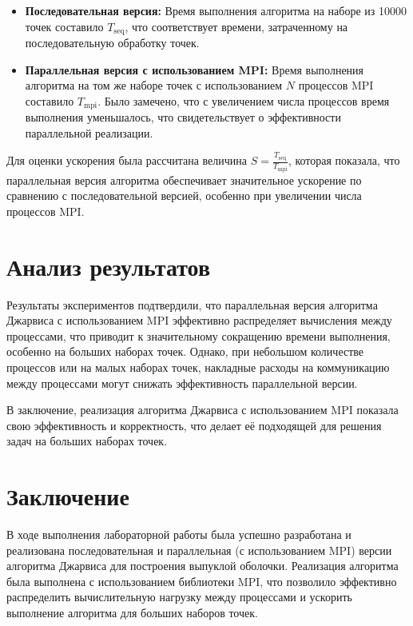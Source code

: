 \documentclass[12pt]{article}
\begin{document}
\begin{itemize}
\item \textbf{Последовательная версия:} Время выполнения алгоритма на наборе из 10000 точек составило \( T_{\text{seq}} \), что соответствует времени, затраченному на последовательную обработку точек.
\item \textbf{Параллельная версия с использованием MPI:} Время выполнения алгоритма на том же наборе точек с использованием \( N \) процессов MPI составило \( T_{\text{mpi}} \). Было замечено, что с увеличением числа процессов время выполнения уменьшалось, что свидетельствует о эффективности параллельной реализации.
\end{itemize}

Для оценки ускорения была рассчитана величина \( S = \frac{T_{\text{seq}}}{T_{\text{mpi}}} \), которая показала, что параллельная версия алгоритма обеспечивает значительное ускорение по сравнению с последовательной версией, особенно при увеличении числа процессов MPI.

\section*{Анализ результатов}

Результаты экспериментов подтвердили, что параллельная версия алгоритма Джарвиса с использованием MPI эффективно распределяет вычисления между процессами, что приводит к значительному сокращению времени выполнения, особенно на больших наборах точек. Однако, при небольшом количестве процессов или на малых наборах точек, накладные расходы на коммуникацию между процессами могут снижать эффективность параллельной версии.

В заключение, реализация алгоритма Джарвиса с использованием MPI показала свою эффективность и корректность, что делает её подходящей для решения задач на больших наборах точек.

\section*{Заключение}

В ходе выполнения лабораторной работы была успешно разработана и реализована последовательная и параллельная (с использованием MPI) версии алгоритма Джарвиса для построения выпуклой оболочки. Реализация алгоритма была выполнена с использованием библиотеки MPI, что позволило эффективно распределить вычислительную нагрузку между процессами и ускорить выполнение алгоритма для больших наборов точек.
\end{document}
